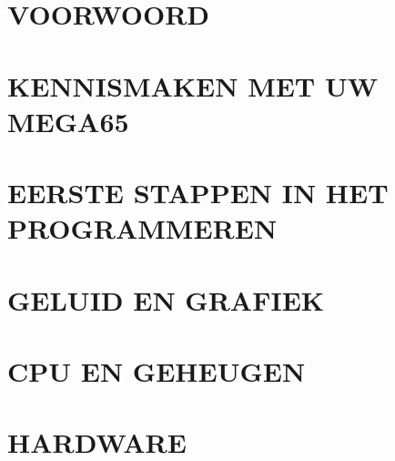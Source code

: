 






\part{VOORWOORD}






\part{KENNISMAKEN MET UW MEGA65}








\part{EERSTE STAPPEN IN HET PROGRAMMEREN}








\part{GELUID EN GRAFIEK}





\part{CPU EN GEHEUGEN}




\part{HARDWARE}

